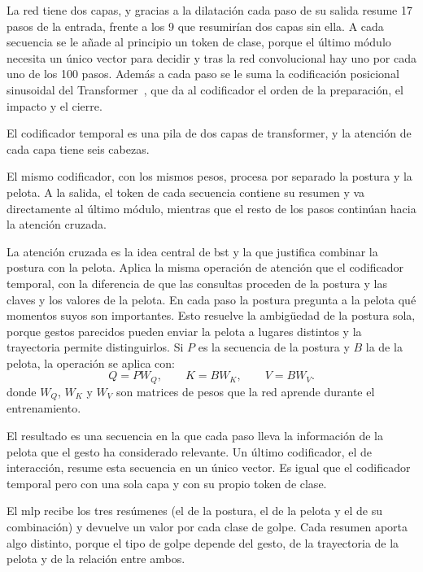 La red tiene dos capas, y gracias a la dilatación cada paso de su salida resume 17 pasos de la entrada, frente a los 9 que resumirían dos capas sin ella.
A cada secuencia se le añade al principio un token de clase, porque el último módulo necesita un único vector para decidir y tras la red convolucional hay uno por cada uno de los 100 pasos.
Además a cada paso se le suma la codificación posicional sinusoidal del Transformer~\cite{vaswani2017attention}, que da al codificador el orden de la preparación, el impacto y el cierre.

El codificador temporal es una pila de dos capas de transformer, y la atención de cada capa tiene seis cabezas.

El mismo codificador, con los mismos pesos, procesa por separado la postura y la pelota.
A la salida, el token de cada secuencia contiene su resumen y va directamente al último módulo, mientras que el resto de los pasos continúan hacia la atención cruzada.

La atención cruzada es la idea central de \acs{bst} y la que justifica combinar la postura con la pelota.
Aplica la misma operación de atención que el codificador temporal, con la diferencia de que las consultas proceden de la postura y las claves y los valores de la pelota.
En cada paso la postura pregunta a la pelota qué momentos suyos son importantes.
Esto resuelve la ambigüedad de la postura sola, porque gestos parecidos pueden enviar la pelota a lugares distintos y la trayectoria permite distinguirlos.
Si $P$ es la secuencia de la postura y $B$ la de la pelota, la operación se aplica con:
\begin{equation}
  Q = PW_Q, \qquad K = BW_K, \qquad V = BW_V.
  \label{eq:cruzada}
\end{equation}
donde $W_Q$, $W_K$ y $W_V$ son matrices de pesos que la red aprende durante el entrenamiento.

El resultado es una secuencia en la que cada paso lleva la información de la pelota que el gesto ha considerado relevante.
Un último codificador, el de interacción, resume esta secuencia en un único vector.
Es igual que el codificador temporal pero con una sola capa y con su propio token de clase.

El \acs{mlp} recibe los tres resúmenes (el de la postura, el de la pelota y el de su combinación) y devuelve un valor por cada clase de golpe.
Cada resumen aporta algo distinto, porque el tipo de golpe depende del gesto, de la trayectoria de la pelota y de la relación entre ambos.

